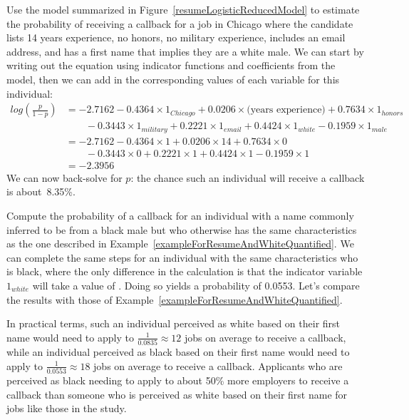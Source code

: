 \begin{examplewrap}
\begin{nexample}{Use the model summarized in
    Figure~\ref{resumeLogisticReducedModel}
    to estimate the probability
    of receiving a callback for a job in Chicago
    where the candidate lists 14 years experience,
    no honors,
    no military experience,
    includes an email address,
    and has a first name that implies they are a white male.}
  \label{exampleForResumeAndWhiteQuantified}%
  We can start by writing out the equation using indicator
  functions and coefficients from the model, then we can
  add in the corresponding values of each variable for this
  individual:
  \begin{align*}
  log\left(\frac{p}{1 - p}\right)
    &= - 2.7162
        - 0.4364 \times 1_{Chicago}
        + 0.0206 \times \text{(years experience)}
        + 0.7634 \times 1_{honors} \\
      &\qquad
          - 0.3443 \times 1_{military}
          + 0.2221 \times 1_{email}
          + 0.4424 \times 1_{white}
          - 0.1959 \times 1_{male} \\
    &= - 2.7162
        - 0.4364 \times 1
        + 0.0206 \times 14
        + 0.7634 \times 0 \\
      &\qquad
          - 0.3443 \times 0
          + 0.2221 \times 1
          + 0.4424 \times 1
          - 0.1959 \times 1 \\
    &= - 2.3956
  \end{align*}
  We can now back-solve for $p$:
  the chance such an individual will receive
  a callback is about~8.35\%.
\end{nexample}
\end{examplewrap}

\begin{examplewrap}
\begin{nexample}{Compute the probability of a callback
    for an individual with a name commonly inferred
    to be from a black male but who otherwise
    has the same characteristics as the one described
    in Example~\ref{exampleForResumeAndWhiteQuantified}.}
  We can complete the same steps for an individual
  with the same characteristics who is black,
  where the only difference in the calculation is that
  the indicator variable
  $1_{white}$ will take a value of .
  Doing so yields a probability of 0.0553.
  Let's compare the results with those of
  Example~\ref{exampleForResumeAndWhiteQuantified}.

  In practical terms, such an individual perceived
  as white based on their first name would need to
  apply to $\frac{1}{0.0835} \approx 12$ jobs on average
  to receive a callback,
  while an individual perceived as black based on their
  first name would need
  to apply to $\frac{1}{0.0553} \approx 18$ jobs on average
  to receive a callback.
  Applicants who are perceived as
  black needing to apply to about 50\% more employers
  to receive a callback than someone who is perceived
  as white based on their first name for jobs like
  those in the study.
\end{nexample}
\end{examplewrap}

